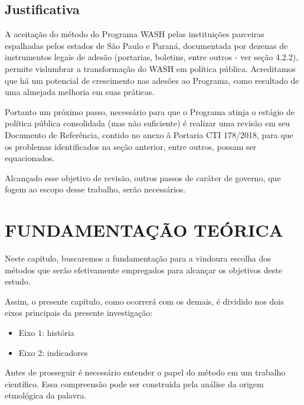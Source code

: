 \section[Justificativa]{Justificativa}\label{Justificativa}
A aceitação do método do Programa WASH pelas instituições parceiras espalhadas pelos estados de São Paulo e Paraná, documentada por dezenas de instrumentos legais de adesão (portarias, boletins, entre outros - ver seção 4.2.2), permite vislumbrar a transformação do WASH em política pública. Acreditamos que há um potencial de crescimento nas adesões ao Programa, como resultado de uma almejada melhoria em suas práticas.

Portanto um próximo passo, necessário para que o Programa atinja o estágio de política pública consolidada (mas não suficiente) é realizar uma revisão em seu Documento de Referência, contido no anexo à Portaria CTI 178/2018, para que os problemas identificados na seção anterior, entre outros, possam ser equacionados.

Alcançado esse objetivo de revisão, outros passos de caráter de governo, que fogem ao escopo desse trabalho, serão necessários.

\chapter[FUNDAMENTAÇÃO TEÓRICA]{FUNDAMENTAÇÃO TEÓRICA}\label{FUNDAMENTAÇÃO TEÓRICA}
Neste capítulo, buscaremos a fundamentação para a vindoura escolha dos métodos que serão efetivamente empregados para alcançar os objetivos deste estudo.

Assim, o presente capítulo, como ocorrerá com os demais, é dividido nos dois eixos principais da presente investigação:


\begin{itemize}
\item Eixo 1: história
\item Eixo 2: indicadores
\end{itemize}

Antes de prosseguir é necessário entender o papel do método em um trabalho científico. Essa compreensão pode ser construída pela análise da origem etmológica da palavra.


\noindent\begin{center}\mbox{\centering{}}\end{center}


